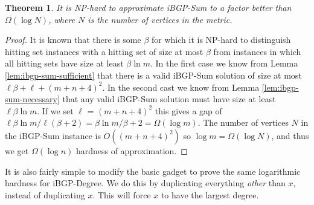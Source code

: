 \documentclass[11pt,letterpaper]{article}
\newtheorem{theorem}{Theorem}[section]
\theoremstyle{definition}
\begin{document}
\begin{theorem}
\label{thm:iBGP_sumhard}
  It is NP-hard to approximate {\sc iBGP-Sum} to a factor better than
  $\Omega(\log N)$, where $N$ is the number of vertices in the
  metric.
\end{theorem}
\begin{proof}
  It is known that there is some $\beta$ for which it is NP-hard to
  distinguish hitting set instances with a hitting set of size at most
  $\beta$ from instances in which all hitting sets have size at least
  $\beta \ln m$.  In the first case we know from Lemma
  \ref{lem:ibgp-sum-sufficient} that there is a valid {\sc iBGP-Sum}
  solution of size at most $\ell \beta + \ell + (m+n+4)^2$.  In the
  second cast we know from Lemma \ref{lem:ibgp-sum-necessary} that any
  valid {\sc iBGP-Sum} solution must have size at least $\ell \beta
  \ln m$.  If we set $\ell$ = $(m+n+4)^2$ this gives a gap of $\ell
  \beta \ln m / \ell(\beta + 2) = \beta \ln m / \beta + 2 =
  \Omega(\log m)$.  The number of vertices $N$ in the {\sc iBGP-Sum}
  instance is $O((m+n+4)^2)$ so $\log m = \Omega(\log N)$, and thus we
  get $\Omega(\log n)$ hardness of approximation.
\end{proof}

It is also fairly simple to modify the basic gadget to prove the same logarithmic hardness for {\sc iBGP-Degree}.  We do this by duplicating everything \emph{other} than $x$, instead of duplicating $x$.  This will force $x$ to have the largest degree.
\end{document}
